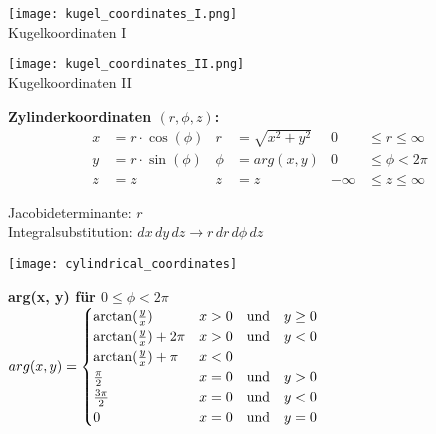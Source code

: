 \begin{minipage}{0.5\columnwidth}
	\texttt{[image: kugel\_coordinates\_I.png]}\\
	Kugelkoordinaten I
\end{minipage}
\begin{minipage}{0.5\columnwidth}
	\texttt{[image: kugel\_coordinates\_II.png]}\\
	Kugelkoordinaten II
\end{minipage}

\textbf{Zylinderkoordinaten $(r, \phi, z)$:}\\
\begin{align*}
	x &= r \cdot \cos(\phi) &  r &= \sqrt{x^2 + y^2} & 0 &\leq r \leq \infty\\
	y &= r \cdot \sin(\phi) &  \phi &= arg(x, y) & 0 &\leq \phi < 2\pi\\
	z &= z & z &= z & -\infty & \leq z \leq \infty
\end{align*}
\begin{minipage}{0.68\columnwidth}
	Jacobideterminante: $r$\\
	Integralsubstitution: $dx \, dy \, dz \to r \, dr \, d\phi \, dz$
\end{minipage}
\begin{minipage}{0.31\columnwidth}
	\hspace{-0.3cm}\texttt{[image: cylindrical\_coordinates]}
\end{minipage}

\textbf{arg(x, y) für $0 \leq \phi < 2\pi $}\\
$arg(x, y) =
\begin{cases}
	\arctan(\frac{y}{x})				& x > 0 \hspace{10pt} \text{und} \hspace{10pt} y \geq 0 \\
	\arctan(\frac{y}{x}) + 2\pi			& x > 0 \hspace{10pt} \text{und} \hspace{10pt} y < 0 \\
	\arctan(\frac{y}{x}) + \pi			& x < 0\\
	\frac{\pi}{2}						& x = 0 \hspace{10pt} \text{und} \hspace{10pt} y > 0\\
	\frac{3\pi}{2}						& x = 0 \hspace{10pt} \text{und} \hspace{10pt} y < 0\\
	0 									& x = 0 \hspace{10pt} \text{und} \hspace{10pt} y = 0
\end{cases}
$

